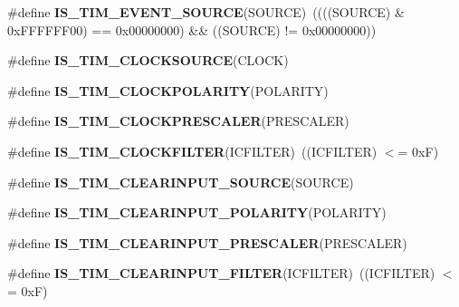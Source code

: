 \begin{DoxyCompactItemize}
\item 
\hypertarget{group___t_i_m___private___macros_ga4ac88c3e43c8250114ea81a6e052d58a}{\#define {\bfseries I\-S\-\_\-\-T\-I\-M\-\_\-\-E\-V\-E\-N\-T\-\_\-\-S\-O\-U\-R\-C\-E}(S\-O\-U\-R\-C\-E)~((((S\-O\-U\-R\-C\-E) \& 0x\-F\-F\-F\-F\-F\-F00) == 0x00000000) \&\& ((\-S\-O\-U\-R\-C\-E) != 0x00000000))}\label{group___t_i_m___private___macros_ga4ac88c3e43c8250114ea81a6e052d58a}

\item 
\#define {\bfseries I\-S\-\_\-\-T\-I\-M\-\_\-\-C\-L\-O\-C\-K\-S\-O\-U\-R\-C\-E}(C\-L\-O\-C\-K)
\item 
\#define {\bfseries I\-S\-\_\-\-T\-I\-M\-\_\-\-C\-L\-O\-C\-K\-P\-O\-L\-A\-R\-I\-T\-Y}(P\-O\-L\-A\-R\-I\-T\-Y)
\item 
\#define {\bfseries I\-S\-\_\-\-T\-I\-M\-\_\-\-C\-L\-O\-C\-K\-P\-R\-E\-S\-C\-A\-L\-E\-R}(P\-R\-E\-S\-C\-A\-L\-E\-R)
\item 
\hypertarget{group___t_i_m___private___macros_gaf1c65e593d3aabc6f7288108cb75aab7}{\#define {\bfseries I\-S\-\_\-\-T\-I\-M\-\_\-\-C\-L\-O\-C\-K\-F\-I\-L\-T\-E\-R}(I\-C\-F\-I\-L\-T\-E\-R)~((I\-C\-F\-I\-L\-T\-E\-R) $<$= 0x\-F)}\label{group___t_i_m___private___macros_gaf1c65e593d3aabc6f7288108cb75aab7}

\item 
\#define {\bfseries I\-S\-\_\-\-T\-I\-M\-\_\-\-C\-L\-E\-A\-R\-I\-N\-P\-U\-T\-\_\-\-S\-O\-U\-R\-C\-E}(S\-O\-U\-R\-C\-E)
\item 
\#define {\bfseries I\-S\-\_\-\-T\-I\-M\-\_\-\-C\-L\-E\-A\-R\-I\-N\-P\-U\-T\-\_\-\-P\-O\-L\-A\-R\-I\-T\-Y}(P\-O\-L\-A\-R\-I\-T\-Y)
\item 
\#define {\bfseries I\-S\-\_\-\-T\-I\-M\-\_\-\-C\-L\-E\-A\-R\-I\-N\-P\-U\-T\-\_\-\-P\-R\-E\-S\-C\-A\-L\-E\-R}(P\-R\-E\-S\-C\-A\-L\-E\-R)
\item 
\hypertarget{group___t_i_m___private___macros_gac46ddca5cf26c731771dc3bc3cb724e9}{\#define {\bfseries I\-S\-\_\-\-T\-I\-M\-\_\-\-C\-L\-E\-A\-R\-I\-N\-P\-U\-T\-\_\-\-F\-I\-L\-T\-E\-R}(I\-C\-F\-I\-L\-T\-E\-R)~((I\-C\-F\-I\-L\-T\-E\-R) $<$= 0x\-F)}\label{group___t_i_m___private___macros_gac46ddca5cf26c731771dc3bc3cb724e9}


\end{DoxyCompactItemize}

